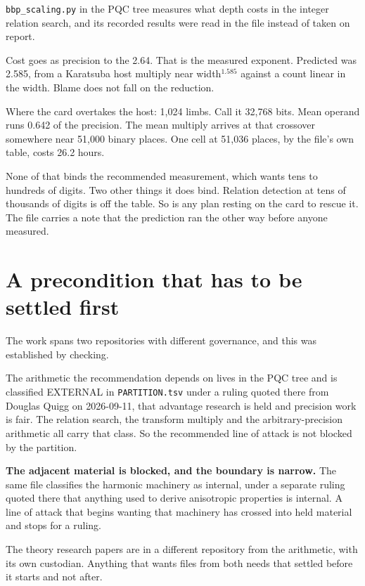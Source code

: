 \texttt{bbp\_scaling.py} in the PQC tree measures what depth costs in the integer relation
search, and its recorded results were read in the file instead of taken on report.

Cost goes as precision to the 2.64. That is the measured exponent. Predicted was 2.585, from a
Karatsuba host multiply near width$^{1.585}$ against a count linear in the width. Blame does not
fall on the reduction.

Where the card overtakes the host: 1{,}024 limbs. Call it 32{,}768 bits. Mean operand runs 0.642 of
the precision. The mean multiply arrives at that crossover somewhere near 51{,}000 binary places.
One cell at 51{,}036 places, by the file's own table, costs 26.2 hours.

None of that binds the recommended measurement, which wants tens to hundreds of digits. Two other
things it does bind. Relation detection at tens of thousands of digits is off the table. So is any
plan resting on the card to rescue it. The file carries a note that the prediction ran the other way
before anyone measured.

\section{A precondition that has to be settled first}

The work spans two repositories with different governance, and this was established by checking.

The arithmetic the recommendation depends on lives in the PQC tree and is classified EXTERNAL
in \texttt{PARTITION.\allowbreak{}tsv} under a ruling quoted there from Douglas Quigg on
2026-09-11, that advantage research is held and precision work is fair. The relation search, the
transform multiply and the arbitrary-precision arithmetic all carry that class. So the recommended
line of attack is not blocked by the partition.

\textbf{The adjacent material is blocked, and the boundary is narrow.} The same file classifies the
harmonic machinery as internal, under a separate ruling quoted there that anything used to derive
anisotropic properties is internal. A line of attack that begins wanting that machinery has crossed
into held material and stops for a ruling.

The theory research papers are in a different repository from the arithmetic, with its own custodian. Anything
that wants files from both needs that settled before it starts and not after.


